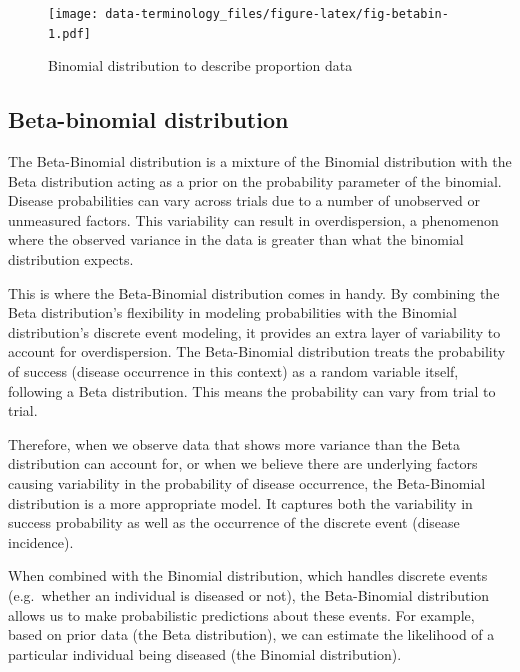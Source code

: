 \documentclass[
  letterpaper,
]{book}
\begin{document}
\begin{figure}

{\centering \texttt{[image: data-terminology\_files/figure-latex/fig-betabin-1.pdf]}

}

\caption{\label{fig-betabin}Binomial distribution to describe proportion
data}

\end{figure}

\hypertarget{beta-binomial-distribution}{%
\subsection{Beta-binomial
distribution}\label{beta-binomial-distribution}}

The Beta-Binomial distribution is a mixture of the Binomial distribution
with the Beta distribution acting as a prior on the probability
parameter of the binomial. Disease probabilities can vary across trials
due to a number of unobserved or unmeasured factors. This variability
can result in overdispersion, a phenomenon where the observed variance
in the data is greater than what the binomial distribution expects.

This is where the Beta-Binomial distribution comes in handy. By
combining the Beta distribution's flexibility in modeling probabilities
with the Binomial distribution's discrete event modeling, it provides an
extra layer of variability to account for overdispersion. The
Beta-Binomial distribution treats the probability of success (disease
occurrence in this context) as a random variable itself, following a
Beta distribution. This means the probability can vary from trial to
trial.

Therefore, when we observe data that shows more variance than the Beta
distribution can account for, or when we believe there are underlying
factors causing variability in the probability of disease occurrence,
the Beta-Binomial distribution is a more appropriate model. It captures
both the variability in success probability as well as the occurrence of
the discrete event (disease incidence).

When combined with the Binomial distribution, which handles discrete
events (e.g.~whether an individual is diseased or not), the
Beta-Binomial distribution allows us to make probabilistic predictions
about these events. For example, based on prior data (the Beta
distribution), we can estimate the likelihood of a particular individual
being diseased (the Binomial distribution).
\end{document}
